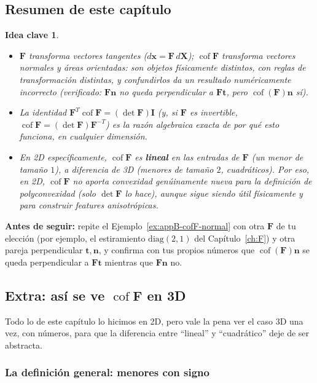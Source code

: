 \documentclass[11pt,a4paper]{article}
\newtheorem{takeaway}{Idea clave}
\newcommand{\Cof}{\operatorname{cof}}
\begin{document}
\subsection{Resumen de este cap\'itulo}

\begin{takeaway}
\begin{itemize}
\item $\bm F$ transforma vectores tangentes ($d\bm x=\bm F\,d\bm X$);
$\Cof\bm F$ transforma vectores normales y \'areas orientadas: son
objetos f\'isicamente distintos, con reglas de transformaci\'on
distintas, y confundirlos da un resultado num\'ericamente incorrecto
(verificado: $\bm F\bm n$ no queda perpendicular a $\bm F\bm t$, pero
$\Cof(\bm F)\bm n$ s\'i).
\item La identidad $\bm F^T\Cof\bm F=(\det\bm F)\bm I$ (y, si $\bm F$
es invertible, $\Cof\bm F=(\det\bm F)\bm F^{-T}$) es la raz\'on
algebraica exacta de por qu\'e esto funciona, en cualquier dimensi\'on.
\item En 2D espec\'ificamente, $\Cof\bm F$ es \textbf{lineal} en las
entradas de $\bm F$ (un menor de tama\~no $1$), a diferencia de 3D
(menores de tama\~no $2$, cuadr\'aticos). Por eso, en 2D, $\Cof\bm F$
no aporta convexidad gen\'uinamente nueva para la definici\'on de
polyconvexidad (solo $\det\bm F$ lo hace), aunque sigue siendo
\'util f\'isicamente y para construir features anisotr\'opicas.
\end{itemize}
\end{takeaway}

\bigskip
\noindent\textbf{Antes de seguir:} repite el
Ejemplo~\ref{ex:appB-cofF-normal} con otra $\bm F$ de tu elecci\'on
(por ejemplo, el estiramiento $\mathrm{diag}(2,1)$ del
Cap\'itulo~\ref{ch:F}) y otra pareja perpendicular $\bm t,\bm n$, y
confirma con tus propios n\'umeros que $\Cof(\bm F)\bm n$ se queda
perpendicular a $\bm F\bm t$ mientras que $\bm F\bm n$ no.

\subsection*{Extra: as\'i se ve $\Cof\bm F$ en 3D}

Todo lo de este cap\'itulo lo hicimos en 2D, pero vale la pena ver el
caso 3D una vez, con n\'umeros, para que la diferencia entre ``lineal''
y ``cuadr\'atico'' deje de ser abstracta.

\subsubsection*{La definici\'on general: menores con signo}
\end{document}
